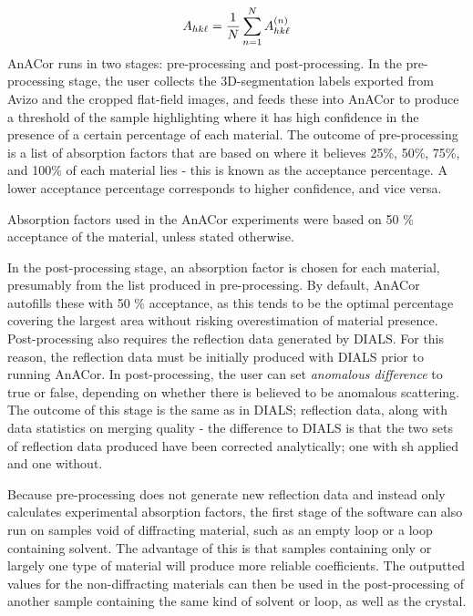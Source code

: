 \begin{equation}
    A_{hk\ell} = \frac{1}{N} \sum_{n=1}^N A_{hk\ell}^{(n)}
\end{equation}
AnACor runs in two stages: pre-processing and post-processing. In the pre-processing stage, the user collects the 3D-segmentation labels exported from Avizo and the cropped flat-field images, and feeds these into AnACor to produce a threshold of the sample highlighting where it has high confidence in the presence of a certain percentage of each material. The outcome of pre-processing is a list of absorption factors that are based on where it believes 25\%, 50\%, 75\%, and 100\% of each material lies - this is known as the acceptance percentage. A lower acceptance percentage corresponds to higher confidence, and vice versa. %

Absorption factors used in the AnACor experiments were based on 50 \% acceptance of the material, unless stated otherwise.

In the post-processing stage, an absorption factor is chosen for each material, presumably from the list produced in pre-processing. By default, AnACor autofills these with 50 \% acceptance, as this tends to be the optimal percentage covering the largest area without risking overestimation of material presence. Post-processing also requires the reflection data generated by DIALS. For this reason, the reflection data must be initially produced with DIALS prior to running AnACor. In post-processing, the user can set \textit{anomalous difference} to true or false, depending on whether there is believed to be anomalous scattering. The outcome of this stage is the same as in DIALS; reflection data, along with data statistics on merging quality - the difference to DIALS is that the two sets of reflection data produced have been corrected analytically; one with \ac{sh} applied and one without.

Because pre-processing does not generate new reflection data and instead only calculates experimental absorption factors, the first stage of the software can also run on samples void of diffracting material, such as an empty loop or a loop containing solvent. The advantage of this is that samples containing only or largely one type of material will produce more reliable coefficients. The outputted values for the non-diffracting materials can then be used in the post-processing of another sample containing the same kind of solvent or loop, as well as the crystal.

